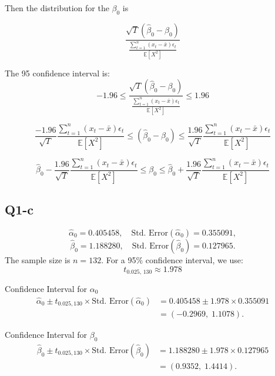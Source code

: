 \documentclass{article} %
\begin{document}
Then the distribution for the $\beta_0$ is


\begin{equation}
 \frac{\sqrt{T}(\hat{\beta}_0 - \beta_0)}{ \frac{\sum_{t=1}^n (x_t - \bar{x})\epsilon_t}{\mathbb{E}[X^2] }}
\end{equation}


The 95 confidence interval is:
\begin{equation}
 -1.96  \leqslant \frac{\sqrt{T}(\hat{\beta}_0 - \beta_0)}{ \frac{\sum_{t=1}^n (x_t - \bar{x})\epsilon_t}{\mathbb{E}[X^2] }} \leqslant 1.96
\end{equation}


\begin{equation}
    \frac{-1.96}{\sqrt{T}} \frac{\sum_{t=1}^n (x_t - \bar{x})\epsilon_t}{\mathbb{E}[X^2] }  \leqslant (\hat{\beta}_0 - \beta_0)  \leqslant  \frac{1.96}{\sqrt{T}} \frac{\sum_{t=1}^n (x_t - \bar{x})\epsilon_t}{\mathbb{E}[X^2] } 
\end{equation}
   
   
\begin{equation}
    \hat{\beta}_0 -\frac{1.96}{\sqrt{T}} \frac{\sum_{t=1}^n (x_t - \bar{x})\epsilon_t}{\mathbb{E}[X^2] }  \leqslant  \beta_0 \leqslant  \hat{\beta}_0 + \frac{1.96}{\sqrt{T}} \frac{\sum_{t=1}^n (x_t - \bar{x})\epsilon_t}{\mathbb{E}[X^2] } 
\end{equation}
   
\subsection{Q1-c}

\[
\hat{\alpha}_0 = 0.405458, \quad \text{Std. Error}(\hat{\alpha}_0) = 0.355091,
\]
\[
\hat{\beta}_0 = 1.188280, \quad \text{Std. Error}(\hat{\beta}_0) = 0.127965.
\]
The sample size is \(n=132\). For a 95\% confidence interval, we use:
\[
t_{0.025,\,130} \approx 1.978 
\]

Confidence Interval for \(\alpha_0\)
\begin{align*}
\hat{\alpha}_0 \pm t_{0.025,130} \times \text{Std. Error}(\hat{\alpha}_0) &= 0.405458 \pm 1.978 \times 0.355091 \\
&= (-0.2969, \; 1.1078).
\end{align*}

Confidence Interval for \(\beta_0\)
\begin{align*}
\hat{\beta}_0 \pm t_{0.025,130} \times \text{Std. Error}(\hat{\beta}_0) &= 1.188280 \pm 1.978 \times 0.127965 \\
&= (0.9352, \; 1.4414).
\end{align*}
\end{document}
